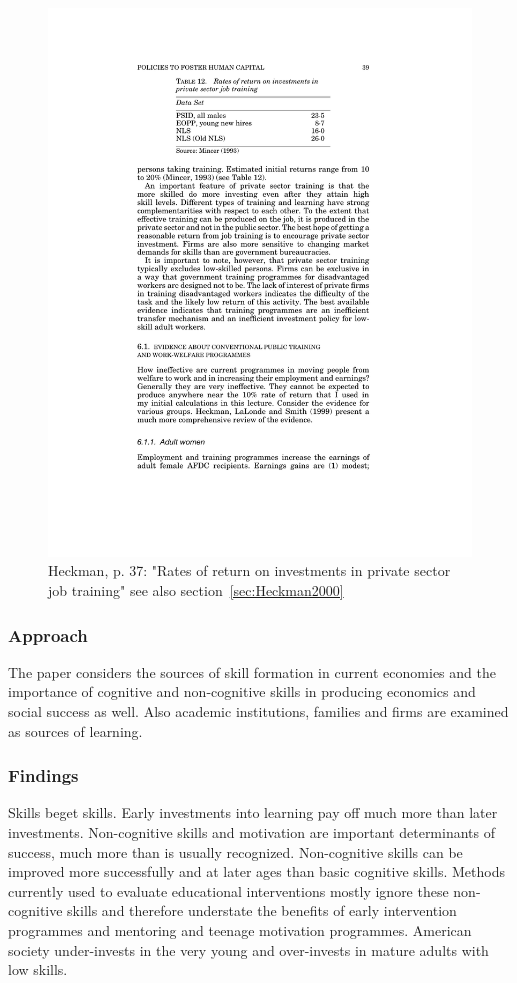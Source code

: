 \documentclass[12pt,a4paper]{article}
\begin{document}
    \begin{figure}[ht]
      \centering
      \includegraphics[width=12cm]{Meeting 10 Policies to foster human capital - Seite 37.pdf}
      \caption{Heckman, p. 37: "Rates of return on investments in private sector job training" see also section~\ref{sec:Heckman2000}}
      \label{fig:Heckman privatesectorjobtraining}
    \end{figure}


      \subsubsection{Approach}
        The paper considers the sources of skill formation in current economies and the importance of cognitive and non-cognitive skills in producing economics and social success as well. Also academic institutions, families and firms are examined as sources of learning.
      \subsubsection{Findings}
        Skills beget skills. Early investments into learning pay off much more than later investments. Non-cognitive skills and motivation are important determinants of success, much more than is usually recognized. Non-cognitive skills can be improved more successfully and at later ages than basic cognitive skills. Methods currently used to evaluate educational interventions mostly ignore these non-cognitive skills and therefore understate the benefits of early intervention programmes and mentoring and teenage motivation programmes. American society under-invests in the very young and over-invests in mature adults with low skills.
\end{document}
